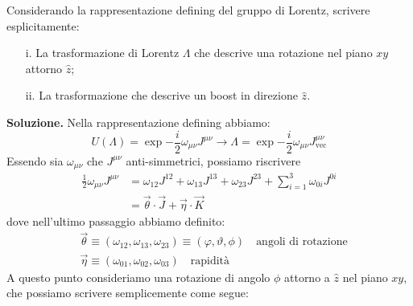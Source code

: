 \documentclass[../main.tex]{subfiles}
\begin{document}
\begin{exercise}
    Considerando la rappresentazione defining del gruppo di Lorentz, scrivere esplicitamente:
    \begin{enumerate}
        \item[i.] La trasformazione di Lorentz $\Lambda$ che descrive una rotazione nel piano $xy$ attorno $\hat z$; 
        \item[ii.] La trasformazione che descrive un boost in direzione $\hat z$.
    \end{enumerate}
        \textbf{Soluzione. } Nella rappresentazione defining abbiamo:
        \[
        U(\Lambda) = \exp{-\frac{i}{2}\omega_{\mu\nu}J^{\mu\nu}} \rightarrow \Lambda = \exp{-\frac{i}{2}\omega_{\mu\nu}J_\text{vec}^{\mu\nu}}
        \]
        Essendo sia $\omega_{\mu\nu}$ che $J^{\mu\nu}$ anti-simmetrici, possiamo riscrivere
        \begin{align*}
            \frac{1}{2}\omega_{\mu\nu}J^{\mu\nu} &= \omega_{12}J^{12} + \omega_{13}J^{13} + \omega_{23}J^{23} + \sum_{i=1}^3\omega_{0i}J^{0i}\\
            &= \Vec{\theta}\cdot\Vec{J} + \Vec{\eta}\cdot\Vec{K}
        \end{align*}
        dove nell'ultimo passaggio abbiamo definito:
        \[
        \boxed{\begin{aligned}
            &\Vec{\theta} \equiv (\omega_{12}, \omega_{13}, \omega_{23}) \equiv (\varphi, \vartheta, \phi) \quad {\text{angoli di rotazione}}\\
            &\Vec{\eta} \equiv (\omega_{01}, \omega_{02}, \omega_{03}) \quad \text{rapidità}
        \end{aligned}}\]
        A questo punto consideriamo una rotazione di angolo $\phi$ attorno a $\hat z$ nel piano $xy$, che possiamo scrivere semplicemente come segue: 
\end{exercise}
\end{document}
